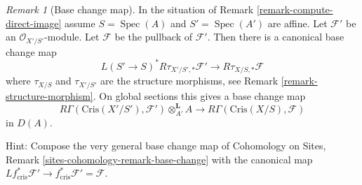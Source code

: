 \documentclass{stacks-project}
\theoremstyle{plain}
\theoremstyle{definition}
\theoremstyle{remark}
\newtheorem{remark}[subsection]{Remark}
\numberwithin{equation}{subsection}
\def\Spec{\mathop{\mathrm{Spec}}}
\begin{document}
\begin{remark}[Base change map]
\label{remark-base-change}
In the situation of Remark \ref{remark-compute-direct-image}
assume $S = \Spec(A)$ and $S' = \Spec(A')$ are affine.
Let $\mathcal{F}'$ be an $\mathcal{O}_{X'/S'}$-module.
Let $\mathcal{F}$ be the pullback of $\mathcal{F}'$.
Then there is a canonical base change map
$$
L(S' \to S)^*R\tau_{X'/S', *}\mathcal{F}'
\longrightarrow
R\tau_{X/S, *}\mathcal{F}
$$
where $\tau_{X/S}$ and $\tau_{X'/S'}$ are the structure morphisms, see
Remark \ref{remark-structure-morphism}. On global sections this
gives a base change map
\begin{equation}
\label{equation-base-change-map}
R\Gamma(\text{Cris}(X'/S'), \mathcal{F}') \otimes^\mathbf{L}_{A'} A
\longrightarrow
R\Gamma(\text{Cris}(X/S), \mathcal{F})
\end{equation}
in $D(A)$.

\medskip\noindent
Hint: Compose the very general base change map of
Cohomology on Sites, Remark \ref{sites-cohomology-remark-base-change}
with the canonical map
$Lf_{\text{cris}}^*\mathcal{F}' \to
f_{\text{cris}}^*\mathcal{F}' = \mathcal{F}$.
\end{remark}
\end{document}
